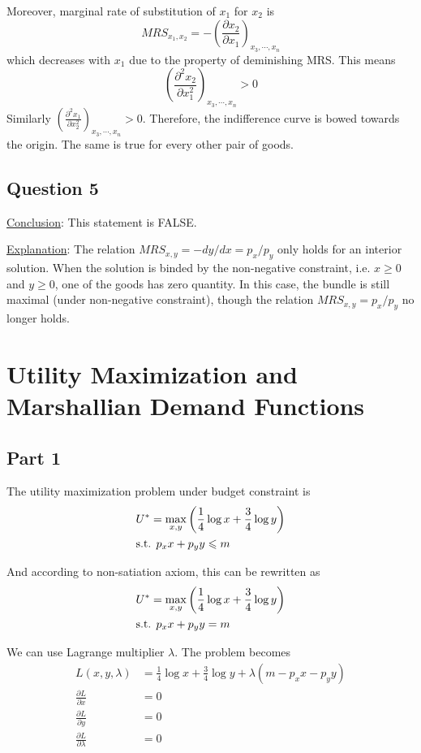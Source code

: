 \documentclass{article}
\begin{document}
Moreover, marginal rate of substitution of $x_1$ for $x_2$ is
\begin{equation*}
	MRS_{x_1,x_2}=-\left(\frac{\partial x_2}{\partial x_1}\right)_{x_3,\cdots,x_n}
\end{equation*}
which decreases with $x_1$ due to the property of deminishing MRS. This means
\begin{equation*}
	\left(\frac{\partial^2x_2}{\partial x_1^2}\right)_{x_3,\cdots,x_n}>0
\end{equation*}
Similarly $\left(\frac{\partial^2x_1}{\partial x_2^2}\right)_{x_3,\cdots,x_n}>0$. Therefore, the indifference curve is bowed towards the origin. The same is true for every other pair of goods.

\subsection{Question 5}
\noindent\underline{Conclusion}: This statement is FALSE.

\noindent\underline{Explanation}: The relation $MRS_{x,y}=-dy/dx=p_x/p_y$ only holds for an interior solution. When the solution is binded by the non-negative constraint, i.e. $x\geqslant0$ and $y\geqslant0$, one of the goods has zero quantity. In this case, the bundle is still maximal (under non-negative constraint), though the relation $MRS_{x,y}=p_x/p_y$ no longer holds.

\section{Utility Maximization and Marshallian Demand Functions}
\subsection{Part 1}
The utility maximization problem under budget constraint is
\begin{align*}
	&U^*=\max_{x,y}\left(\frac{1}{4}\log x+\frac{3}{4}\log y\right)\\
	&\textup{s.t. }p_xx+p_yy\leqslant m
\end{align*}

And according to non-satiation axiom, this can be rewritten as
\begin{align*}
	&U^*=\max_{x,y}\left(\frac{1}{4}\log x+\frac{3}{4}\log y\right)\\
	&\textup{s.t. }p_xx+p_yy=m
\end{align*}

We can use Lagrange multiplier $\lambda$. The problem becomes
\begin{align*}
	L(x,y,\lambda)&=\frac{1}{4}\log x+\frac{3}{4}\log y+\lambda(m-p_xx-p_yy)\\
	\frac{\partial L}{\partial x}&=0\\
	\frac{\partial L}{\partial y}&=0\\
	\frac{\partial L}{\partial\lambda}&=0
\end{align*}
\end{document}
